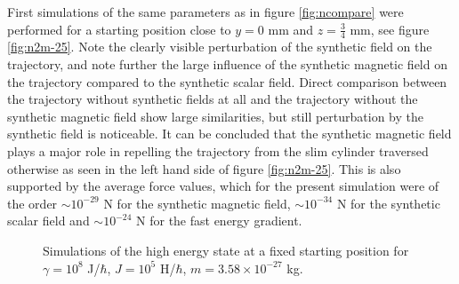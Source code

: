 \documentclass[main.tex]{subfiles}
\begin{document}
First simulations of the same parameters as in figure \ref{fig:ncompare} were performed for
a starting position close to \(y=0\) mm and \(z = \frac{3}{4}\) mm, see figure
\ref{fig:n2m-25}. Note the clearly visible perturbation of the synthetic field on the trajectory,
and note further the large influence of the synthetic magnetic field on the trajectory
compared to the synthetic scalar field. Direct comparison between the trajectory without
synthetic fields at all and the trajectory without the synthetic magnetic field show large
similarities, but still perturbation by the synthetic field is noticeable. It can be
concluded that the synthetic magnetic field plays a major role in repelling the trajectory
from the slim cylinder traversed otherwise as seen in the left hand side of figure \ref{fig:n2m-25}. This is also
supported by the average force values, which for the present simulation were of the order
\(\sim 10^{-29}\) N for the synthetic magnetic field, \(\sim 10^{-34}\) N for the synthetic
scalar field and \(\sim 10^{-24}\) N for the fast energy gradient.

\begin{figure}[h]
    \centering
    \qquad
    \caption{\centering Simulations of the high energy state at a fixed starting position for \(\gamma
    = 10^{8}\) J/\(\hbar{}\), \(J= 10^{5}\) H/\(\hbar{}\), \(m = 3.58\times 10^{-27}\) kg.}%
    \label{fig:n2m-27A}
\end{figure}
\end{document}
